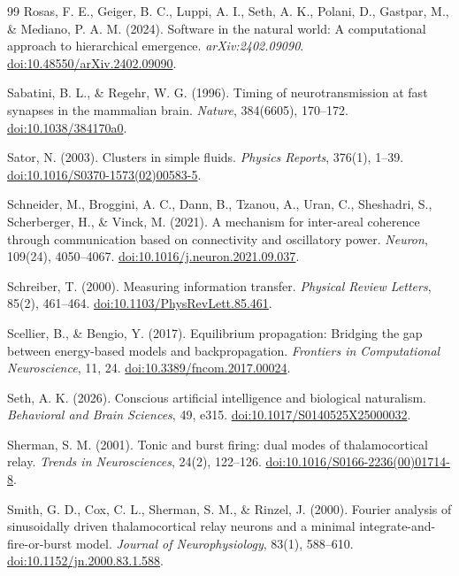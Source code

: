 \begin{thebibliography}{99}
 Rosas, F. E., Geiger, B. C., Luppi, A. I., Seth, A. K., Polani, D., Gastpar, M., \& Mediano, P. A. M. (2024). Software in the natural world: A computational approach to hierarchical emergence. \textit{arXiv:2402.09090}. \href{https://doi.org/10.48550/arXiv.2402.09090}{doi:10.48550/arXiv.2402.09090}.

 Sabatini, B. L., \& Regehr, W. G. (1996). Timing of neurotransmission at fast synapses in the mammalian brain. \textit{Nature}, 384(6605), 170--172. \href{https://doi.org/10.1038/384170a0}{doi:10.1038/384170a0}.

 Sator, N. (2003). Clusters in simple fluids. \textit{Physics Reports}, 376(1), 1--39. \href{https://doi.org/10.1016/S0370-1573(02)00583-5}{doi:10.1016/S0370-1573(02)00583-5}.

 Schneider, M., Broggini, A. C., Dann, B., Tzanou, A., Uran, C., Sheshadri, S., Scherberger, H., \& Vinck, M. (2021). A mechanism for inter-areal coherence through communication based on connectivity and oscillatory power. \textit{Neuron}, 109(24), 4050--4067. \href{https://doi.org/10.1016/j.neuron.2021.09.037}{doi:10.1016/j.neuron.2021.09.037}.

 Schreiber, T. (2000). Measuring information transfer. \textit{Physical Review Letters}, 85(2), 461--464. \href{https://doi.org/10.1103/PhysRevLett.85.461}{doi:10.1103/PhysRevLett.85.461}.

 Scellier, B., \& Bengio, Y. (2017). Equilibrium propagation: Bridging the gap between energy-based models and backpropagation. \textit{Frontiers in Computational Neuroscience}, 11, 24. \href{https://doi.org/10.3389/fncom.2017.00024}{doi:10.3389/fncom.2017.00024}.

 Seth, A. K. (2026). Conscious artificial intelligence and biological naturalism. \textit{Behavioral and Brain Sciences}, 49, e315. \href{https://doi.org/10.1017/S0140525X25000032}{doi:10.1017/S0140525X25000032}.

 Sherman, S. M. (2001). Tonic and burst firing: dual modes of thalamocortical relay. \textit{Trends in Neurosciences}, 24(2), 122--126. \href{https://doi.org/10.1016/S0166-2236(00)01714-8}{doi:10.1016/S0166-2236(00)01714-8}.

 Smith, G. D., Cox, C. L., Sherman, S. M., \& Rinzel, J. (2000). Fourier analysis of sinusoidally driven thalamocortical relay neurons and a minimal integrate-and-fire-or-burst model. \textit{Journal of Neurophysiology}, 83(1), 588--610. \href{https://doi.org/10.1152/jn.2000.83.1.588}{doi:10.1152/jn.2000.83.1.588}.


\end{thebibliography}
